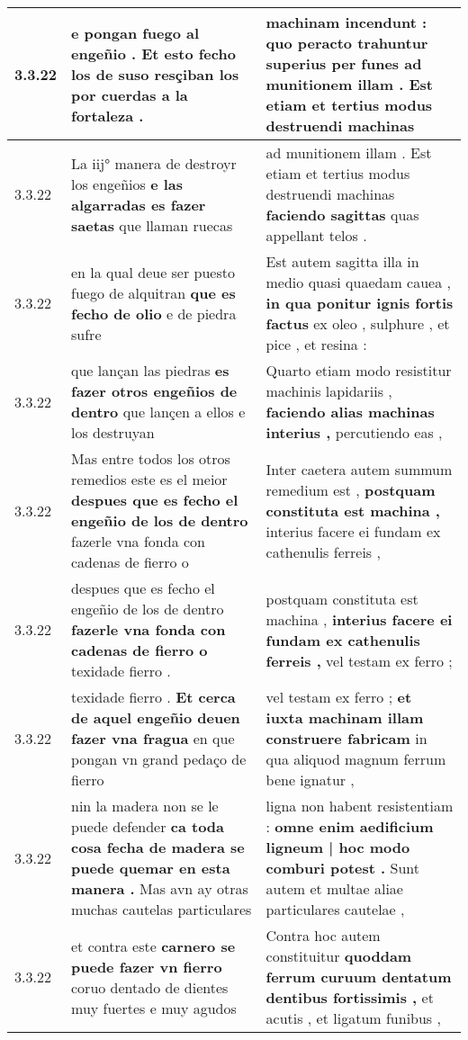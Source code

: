 \begin{tabular}{|p{1cm}|p{6.5cm}|p{6.5cm}|}
3.3.22 & e pongan fuego al engeñio . \textbf{ Et esto fecho los de suso resçiban los } por cuerdas a la fortaleza . & machinam incendunt : \textbf{ quo peracto trahuntur superius per funes } ad munitionem illam . Est etiam et tertius modus destruendi machinas \\\hline
3.3.22 & La iij° manera de destroyr los engeñios \textbf{ e las algarradas es fazer saetas } que llaman ruecas & ad munitionem illam . Est etiam et tertius modus destruendi machinas \textbf{ faciendo sagittas } quas appellant telos . \\\hline
3.3.22 & en la qual deue ser puesto fuego de alquitran \textbf{ que es fecho de olio } e de piedra sufre & Est autem sagitta illa in medio quasi quaedam cauea , \textbf{ in qua ponitur ignis fortis factus } ex oleo , sulphure , et pice , et resina : \\\hline
3.3.22 & que lançan las piedras \textbf{ es fazer otros engeñios de dentro } que lançen a ellos e los destruyan & Quarto etiam modo resistitur machinis lapidariis , \textbf{ faciendo alias machinas interius , } percutiendo eas , \\\hline
3.3.22 & Mas entre todos los otros remedios este es el meior \textbf{ despues que es fecho el engeñio de los de dentro } fazerle vna fonda con cadenas de fierro o & Inter caetera autem summum remedium est , \textbf{ postquam constituta est machina , } interius facere ei fundam ex cathenulis ferreis , \\\hline
3.3.22 & despues que es fecho el engeñio de los de dentro \textbf{ fazerle vna fonda con cadenas de fierro o } texidade fierro . & postquam constituta est machina , \textbf{ interius facere ei fundam ex cathenulis ferreis , } vel testam ex ferro ; \\\hline
3.3.22 & texidade fierro . \textbf{ Et cerca de aquel engeñio deuen fazer vna fragua } en que pongan vn grand pedaço de fierro & vel testam ex ferro ; \textbf{ et iuxta machinam illam construere fabricam } in qua aliquod magnum ferrum bene ignatur , \\\hline
3.3.22 & nin la madera non se le puede defender \textbf{ ca toda cosa fecha de madera se puede quemar en esta manera . } Mas avn ay otras muchas cautelas particulares & ligna non habent resistentiam : \textbf{ omne enim aedificium ligneum | hoc modo comburi potest . } Sunt autem et multae aliae particulares cautelae , \\\hline
3.3.22 & et contra este \textbf{ carnero se puede fazer vn fierro } coruo dentado de dientes muy fuertes e muy agudos & Contra hoc autem constituitur \textbf{ quoddam ferrum curuum dentatum dentibus fortissimis , } et acutis , et ligatum funibus , \\\hline

\end{tabular}
